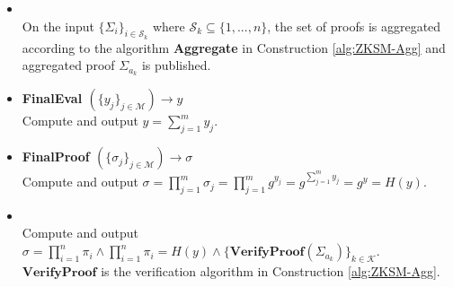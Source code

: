 \begin{algorithm}
\begin{itemize}
\item {} \\
On the input $\{ \Sigma_i \}_{i\in\mathcal{S}_k}$ where $\mathcal{S}_k\subseteq\{1,...,n\}$, the set of proofs is aggregated according to the algorithm \textbf{Aggregate} in Construction \ref{alg:ZKSM-Agg} and  aggregated proof $\Sigma_{a_k}$ is published. 

\item\textbf{FinalEval $(\{y_j\}_{j\in\mathcal{M}})\xrightarrow[]{}y$}\\
Compute and output $y = \sum_{j=1}^m y_{j}$.

\item\textbf{FinalProof $(\{\sigma_j\}_{j\in\mathcal{M}})\xrightarrow[]{}\sigma$}\\
Compute and output $\sigma = \prod_{j=1}^m \sigma_j = \prod_{j=1}^m g^{y_{j}} =  g^{\sum_{j=1}^m y_{j}}= g^{y}=H(y)$.

\item{}\\
Compute and output $\sigma= \prod_{i=1}^n \pi_i \wedge \prod_{i=1}^n \pi_i = H(y)\wedge \{\textbf{VerifyProof}(\Sigma_{a_k})\}_{k\in\mathcal{K}}$. $\textbf{VerifyProof}$ is the verification algorithm in Construction \ref{alg:ZKSM-Agg}.
\end{itemize}
\label{alg:VAHSS-HSS-RP-Agg}
\end{algorithm}






